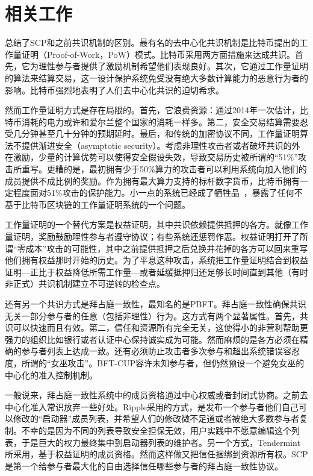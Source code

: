 \section{相关工作}

总结了SCP和之前共识机制的区别。最有名的去中心化共识机制是比特币提出的工作量证明（Proof-of-Work，PoW）模式。比特币采用两方面措施来达成共识。首先，它为理性参与者提供了激励机制希望他们表现良好。其次，它通过工作量证明的算法来结算交易，这一设计保护系统免受没有绝大多数计算能力的恶意行为者的影响。比特币强烈地表明了人们去中心化共识的迫切希求。

然而工作量证明方式是存在局限的。首先，它浪费资源：通过2014年一次估计，比特币消耗的电力或许和爱尔兰整个国家的消耗一样多。第二，安全交易结算需要忍受几分钟甚至几十分钟的预期延时。最后，和传统的加密协议不同，工作量证明算法不提供渐进安全（asymptotic security）。考虑非理性攻击者或者破坏共识的外在激励，少量的计算优势可以使得安全假设失效，导致交易历史被所谓的``51\%''攻击所重写。更糟的是，最初拥有少于50\%算力的攻击者可以利用系统向加入他们的成员提供不成比例的奖励。作为拥有最大算力支持的标杆数字货币，比特币拥有一定程度面对51\%攻击的保护能力。小一点的系统已经成了牺牲品~\cite{attack_bbt2013,attack_cb2013}，暴露了任何不基于比特币区块链的工作量证明系统的一个问题。


工作量证明的一个替代方案是权益证明，其中共识依赖提供抵押的各方。就像工作量证明，奖励鼓励理性参与者遵守协议；有些系统还惩罚作恶。权益证明打开了所谓``零成本''攻击的可能性，其中之前提供抵押之后兑换并花掉的各方可以回来重写他们拥有权益那时开始的历史。为了平息这种攻击，系统把工作量证明结合到权益证明---正比于权益降低所需工作量---或者延缓抵押归还足够长时间直到其他（有时非正式）共识机制建立不可逆转的检查点。

还有另一个共识方式是拜占庭一致性，最知名的是PBFT。拜占庭一致性确保共识无关一部分参与者的任意（包括非理性）行为。这方式有两个显著属性。首先，共识可以快速而且有效。第二，信任和资源所有完全无关，这使得小的非营利帮助更强力的组织比如银行或者认证中心保持诚实成为可能。然而麻烦的是各方必须在精确的参与者列表上达成一致。还有必须防止攻击者多次参与和超出系统错误容忍度，所谓的``女巫攻击''。BFT-CUP容许未知参与者，但仍然预设一个避免女巫的中心化的准入控制机制。

一般说来，拜占庭一致性系统中的成员资格通过中心权威或者封闭式协商。之前去中心化准入常识放弃一些好处。Ripple采用的方式，是发布一个参与者他们自己可以修改的``启动器''成员列表，并希望人们的修改微不足道或者被绝大多数参与者复制。不幸的是因为不同的列表导致安全担保无效，用户实践中不愿意编辑这个列表，于是巨大的权力最终集中到启动器列表的维护者。另一个方式，Tendermint所采用，基于权益证明的成员资格。然而这样做又把信任捆绑到资源所有权。SCP是第一个给参与者最大化的自由选择信任哪些参与者的拜占庭一致性协议。